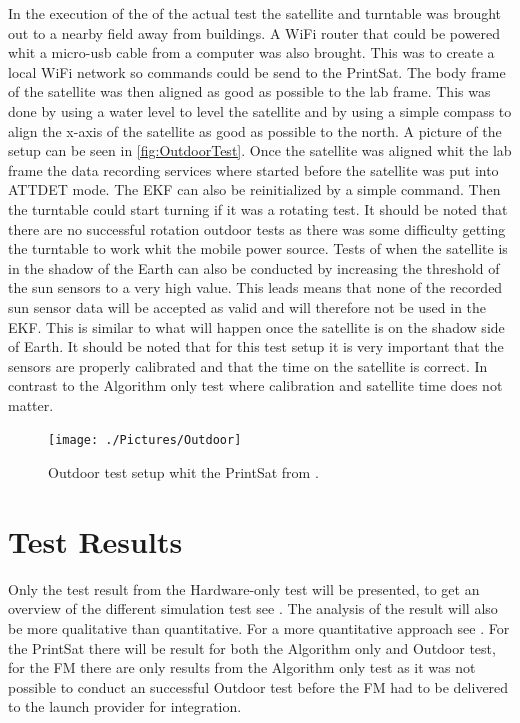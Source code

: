 In the execution of the of the actual test the satellite and turntable was brought out to a nearby field away from buildings. A WiFi router that could be powered whit a micro-usb cable from a computer was also brought. This was to create a local WiFi network so commands could be send to the PrintSat. The body frame of the satellite was then aligned as good as possible to the lab frame. This was done by using a water level to level the satellite and by using a simple compass to align the x-axis of the satellite as good as possible to the north. A picture of the setup can be seen in \autoref{fig:OutdoorTest}. Once the satellite was aligned whit the lab frame the data recording services where started before the satellite was put into ATTDET mode. The EKF can also be reinitialized by a simple command. Then the turntable could start turning if it was a rotating test. It should be noted that there are no successful rotation outdoor tests as there was some difficulty getting the turntable to work whit the mobile power source. Tests of when the satellite is in the shadow of the Earth can also be conducted by increasing the threshold of the sun sensors to a very high value. This leads means that none of the recorded sun sensor data will be accepted as valid and will therefore not be used in the EKF. This is similar to what will happen once the satellite is on the shadow side of Earth. It should be noted that for this test setup it is very important that the sensors are properly calibrated and that the time on the satellite is correct. In contrast to the Algorithm only test where calibration and satellite time does not matter.

\begin{figure}[tbp]
	\centering
	\texttt{[image: ./Pictures/Outdoor]}
	\caption{Outdoor test setup whit the PrintSat from \cite{DavidThesis}.}
	\label{fig:OutdoorTest}
\end{figure}

\ifdraft
\section{Test Results}
Only the test result from the Hardware-only test will be presented, to get an overview of the different simulation test see \cite{DavidThesis}. The analysis of the result will also be more qualitative than quantitative. For a more quantitative approach see \cite{DavidThesis}. For the PrintSat there will be result for both the Algorithm only and Outdoor test, for the FM there are only results from the Algorithm only test as it was not possible to conduct an successful Outdoor test before the FM had to be delivered to the launch provider for integration. 


